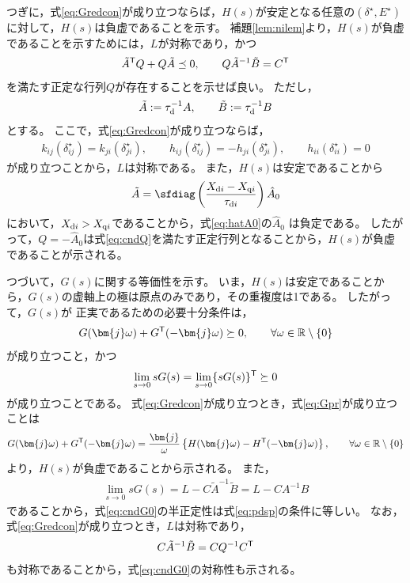 \documentclass[tombow,dvipdfmx]{corona-a5}
\begin{document}
\begin{証明}
つぎに，式\ref{eq:Gredcon}が成り立つならば，$H(s)$が安定となる任意の$(\delta^{\star},E^{\star})$に対して，$H(s)$は負虚であることを示す。
補題\ref{lem:nilem}より，$H(s)$が負虚であることを示すためには，$L$が対称であり，かつ
\begin{align}\label{eq:cndQ}
\tilde{A}^{\sf T}Q + Q\tilde{A} \preceq 0
,\qquad
Q\tilde{A}^{-1}\tilde{B}=C^{\sf T}
\end{align}
を満たす正定な行列$Q$が存在することを示せば良い。
ただし，
\begin{align*}
\tilde{A}:= \tau_{\rm d}^{-1}A
,\qquad
\tilde{B}:= \tau_{\rm d}^{-1}B
\end{align*}
とする。
ここで，式\ref{eq:Gredcon}が成り立つならば，
\begin{align*}
k_{ij}(\delta_{ij}^{\star}) =
k_{ji}(\delta_{ji}^{\star})
,\qquad
h_{ij}(\delta_{ij}^{\star}) = 
- h_{ji}(\delta_{ji}^{\star}),\qquad
h_{ii}(\delta_{ii}^{\star}) = 0
\end{align*}
が成り立つことから，$L$は対称である。
また，$H(s)$は安定であることから
\begin{align*}
\tilde{A} = 
\sfdiag \left( \frac{X_{{\rm d}i} -  X_{{\rm q}i}}{\tau_{{\rm d}i}} \right)
\hat{A}_0
\end{align*}
において，$X_{{\rm d}i} > X_{{\rm q}i}$であることから，式\ref{eq:hatA0}の$\hat{A}_0$
は負定である。
したがって，$Q=-\hat{A}_0$は式\ref{eq:cndQ}を満たす正定行列となることから，$H(s)$が負虚であることが示される。


つづいて，$G(s)$に関する等価性を示す。
いま，$H(s)$は安定であることから，$G(s)$の虚軸上の極は原点のみであり，その重複度は1である。
したがって，$G(s)$が
正実であるための必要十分条件は，
\begin{align}\label{eq:Gpr}
G(\bm{j}\omega) + G^{\sf T}(-\bm{j}\omega) \succeq 0
,\qquad \forall \omega \in \mathbb{R}\setminus\{0\}
\end{align}
が成り立つこと，かつ
\begin{align}\label{eq:cndG0}
\lim_{s\rightarrow 0} s G(s) = \lim_{s\rightarrow 0} \{ s G(s)\}^{\sf T}\succeq 0
\end{align}
が成り立つことである。
式\ref{eq:Gredcon}が成り立つとき，式\ref{eq:Gpr}が成り立つことは
\begin{align}\label{eq:NIineq}
G(\bm{j}\omega) + G^{\sf T}(-\bm{j}\omega)
=
\frac{\bm{j}}{\omega} \left\{
H(\bm{j}\omega) - H^{\sf T}(-\bm{j}\omega)
\right\}
,\qquad \forall \omega \in \mathbb{R}\setminus\{0\}
\end{align}
より，$H(s)$が負虚であることから示される。
また，
\begin{align*}
\lim_{s\rightarrow 0} s G(s) =
L - C\tilde{A}^{-1}\tilde{B} = L - C A^{-1} B
\end{align*}
であることから，式\ref{eq:cndG0}の半正定性は式\ref{eq:pdsp}の条件に等しい。
なお，式\ref{eq:Gredcon}が成り立つとき，$L$は対称であり，
\begin{align*}
C\tilde{A}^{-1}\tilde{B} = C Q^{-1} C^{\sf T}
\end{align*}
も対称であることから，式\ref{eq:cndG0}の対称性も示される。


\end{証明}
\end{document}
